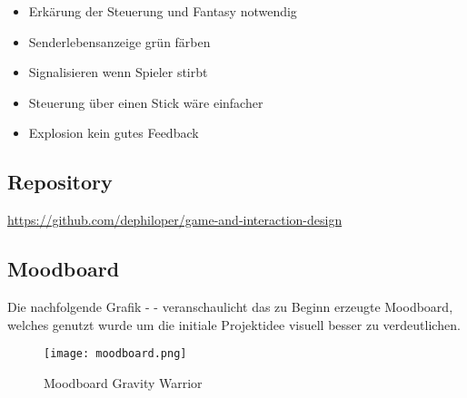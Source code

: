 \documentclass[11pt]{scrartcl}
\begin{document}
\begin{itemize}
\setlength{\parskip}{0pt}
\item Erkärung der Steuerung und Fantasy notwendig
\item Senderlebensanzeige grün färben
\item Signalisieren wenn Spieler stirbt
\item Steuerung über einen Stick wäre einfacher
\item Explosion kein gutes Feedback
\end{itemize}

\newpage
\subsection{Repository}
\url{https://github.com/dephiloper/game-and-interaction-design}
\subsection{Moodboard}
Die nachfolgende Grafik -  - veranschaulicht das zu Beginn erzeugte Moodboard, welches genutzt wurde um die initiale Projektidee visuell besser zu verdeutlichen.

\begin{figure}[htp]
	\centering
	\texttt{[image: moodboard.png]}
	\caption{Moodboard Gravity Warrior}
	\label{fig:mood-board}
\end{figure}

\newpage


\newpage
\listoffigures 
\listoftables 
\end{document}
